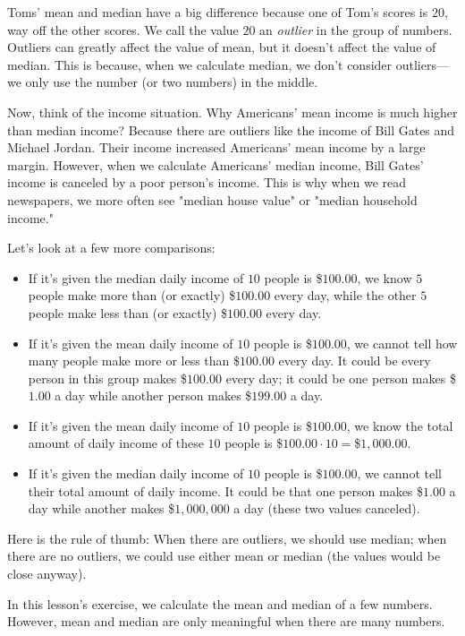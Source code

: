 Toms' mean and median have a big difference because one of Tom's scores is $20$, way off the other scores. We call the value $20$ an \textit{outlier} in the group of numbers. Outliers can greatly affect the value of mean, but it doesn't affect the value of median. This is because, when we calculate median, we don't consider outliers---we only use the number (or two numbers) in the middle.

Now, think of the income situation. Why Americans' mean income is much higher than median income? Because there are outliers like the income of Bill Gates and Michael Jordan. Their income increased Americans' mean income by a large margin. However, when we calculate Americans' median income, Bill Gates' income is canceled by a poor person's income. This is why when we read newspapers, we more often see "median house value" or "median household income."

Let's look at a few more comparisons:
\begin{itemize}
\item If it's given the median daily income of $10$ people is \$$100.00$, we know $5$ people make more than (or exactly) \$$100.00$ every day, while the other $5$ people make less than (or exactly) \$$100.00$ every day. 
\item If it's given the mean daily income of $10$ people is \$$100.00$, we cannot tell how many people make more or less than \$$100.00$ every day. It could be every person in this group makes \$$100.00$ every day; it could be one person makes \$$1.00$ a day while another person makes \$$199.00$ a day.
\item If it's given the mean daily income of $10$ people is \$$100.00$, we know the total amount of daily income of these $10$ people is \$$100.00\cdot10=$\$$1,000.00$.
\item If it's given the median daily income of $10$ people is \$$100.00$, we cannot tell their total amount of daily income. It could be that one person makes \$$1.00$ a day while another makes \$$1,000,000$ a day (these two values canceled).
\end{itemize}

Here is the rule of thumb: When there are outliers, we should use median; when there are no outliers, we could use either mean or median (the values would be close anyway).

In this lesson's exercise, we calculate the mean and median of a few numbers. However, mean and median are only meaningful when there are many numbers.

